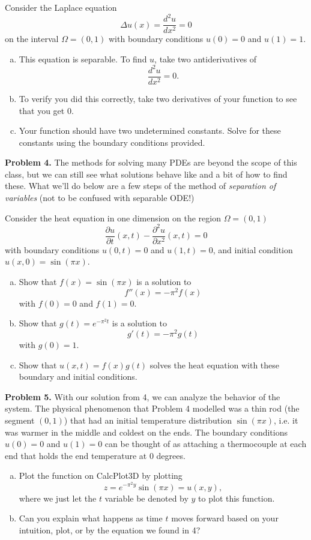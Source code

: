 \documentclass[12pt]{report} %
\theoremstyle{definition}
\begin{document}
Consider the Laplace equation
\[
\Delta u(x) = \frac{d^2u}{dx^2} = 0
\]
on the interval $\Omega = (0,1)$ with boundary conditions $u(0)=0$ and $u(1)=1$.  
\begin{enumerate}[(a)]
    \item This equation is separable. To find $u$, take two antiderivatives of
    \[
    \frac{d^2u}{dx^2}=0.
    \]
    \item To verify you did this correctly, take two derivatives of your function to see that you get $0$.
    \item Your function should have two undetermined constants.  Solve for these constants using the boundary conditions provided.
\end{enumerate}
\vspace*{.5cm}

\noindent\textbf{Problem 4.} The methods for solving many PDEs are beyond the scope of this class, but we can still see what solutions behave like and a bit of how to find these. What we'll do below are a few steps of the method of \emph{separation of variables} (not to be confused with separable ODE!) 

Consider the heat equation in one dimension on the region $\Omega = (0,1)$
\[
\frac{\partial u}{\partial t}(x,t) - \frac{\partial^2 u}{\partial x^2}(x,t) = 0
\]
with boundary conditions $u(0,t)=0$ and $u(1,t)=0$, and initial condition $u(x,0)=\sin(\pi x)$.
\begin{enumerate}[(a)]
    \item Show that $f(x)=\sin(\pi x)$ is a solution to
    \[
    f''(x)=-\pi^2 f(x)
    \]
    with $f(0)=0$ and $f(1)=0$.
    \item Show that $g(t) = e^{-\pi^2 t}$ is a solution to 
    \[
    g'(t) = -\pi^2 g(t)
    \]
    with $g(0)=1$.
    \item Show that $u(x,t)=f(x)g(t)$ solves the heat equation with these boundary and initial conditions.
\end{enumerate}
\vspace*{.5cm}

\noindent\textbf{Problem 5.} With our solution from 4, we can analyze the behavior of the system.  The physical phenomenon that Problem 4 modelled was a thin rod (the segment $(0,1)$) that had an initial temperature distribution $\sin(\pi x)$, i.e. it was warmer in the middle and coldest on the ends.  The boundary conditions $u(0)=0$ and $u(1)=0$ can be thought of as attaching a thermocouple at each end that holds the end temperature at $0$ degrees.  
\begin{enumerate}[(a)]
    \item Plot the function on CalcPlot3D by plotting
    \[
    z=e^{-\pi^2 y} \sin(\pi x)= u(x,y),
    \]
    where we just let the $t$ variable be denoted by $y$ to plot this function.
    \item Can you explain what happens as time $t$ moves forward based on your intuition, plot, or by the equation we found in 4?
\end{enumerate}
\end{document}
